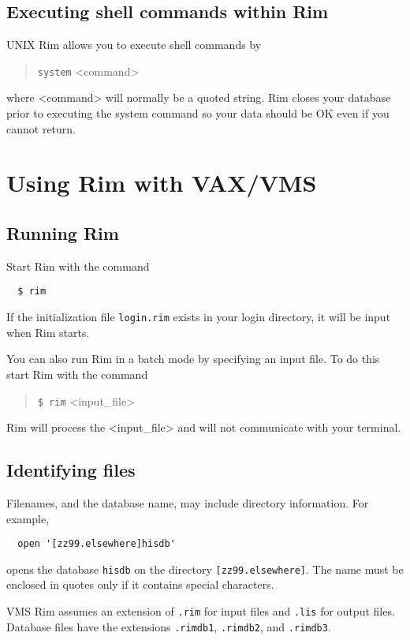 \documentclass[11pt,a4paper]{report}
\begin{document}
 
\subsection{Executing shell commands within Rim}
%
UNIX Rim allows you to execute shell
commands by
\begin{verse}
  \verb!system! <command>
\end{verse}
where <command> will normally be a quoted string.
Rim closes your database prior to executing
the system command so your data should be OK even if you
cannot return.
 
 
\section{Using Rim with VAX/VMS}
%
 
\subsection{Running Rim}
Start Rim with the command
\begin{verbatim}
  $ rim 
\end{verbatim}
If the initialization file \verb!login.rim! exists in your login directory, it will
be input when Rim starts.
 
You can also run Rim in a batch mode by specifying an input file.
To do this start Rim with the command
\begin{verse}
  \verb!$ rim! <input\_file>
\end{verse}
Rim will process the <input\_file> and will not communicate
with your terminal.
 
\subsection{Identifying files}
%
Filenames, and the database name, may include directory information.
For example,
\begin{verbatim}
  open '[zz99.elsewhere]hisdb'
\end{verbatim}
opens the database \verb!hisdb! on the directory \verb![zz99.elsewhere]!.
The name must be enclosed in quotes only if it
contains special characters.
 
VMS Rim assumes an extension of \verb!.rim! for input files and
\verb!.lis! for output files.
Database files have the extensions \verb!.rimdb1!, \verb!.rimdb2!, and \verb!.rimdb3!.
 
\end{document}
